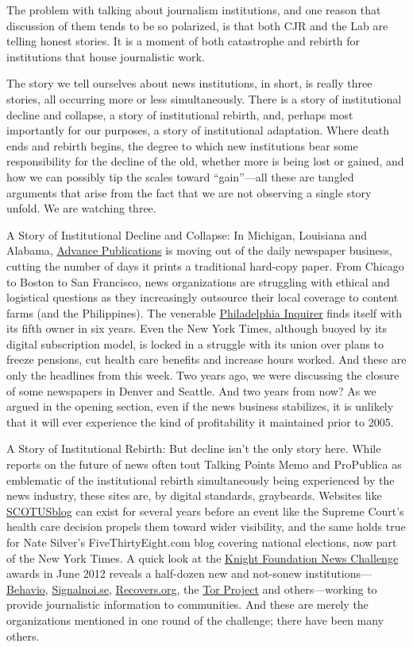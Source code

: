 The problem with talking about journalism institutions, and one reason that discussion
of them tends to be so polarized, is that both CJR and the Lab are telling
honest stories. It is a moment of both catastrophe and rebirth for institutions that
house journalistic work.

The story we tell ourselves about news institutions, in short, is really three stories,
all occurring more or less simultaneously. There is a story of institutional decline
and collapse, a story of institutional rebirth, and, perhaps most importantly for our
purposes, a story of institutional adaptation. Where death ends and rebirth begins,
the degree to which new institutions bear some responsibility for the decline of
the old, whether more is being lost or gained, and how we can possibly tip the
scales toward ``gain''—all these are tangled arguments that arise from the fact that
we are not observing a single story unfold. We are watching three.

A Story of Institutional Decline and Collapse: In Michigan, Louisiana and
Alabama, \href{http://www.advance.net/index.ssf}{Advance Publications} is moving out of the daily newspaper
business, cutting the number of days it prints a traditional hard-copy
paper. From Chicago to Boston to San Francisco, news organizations
are struggling with ethical and logistical questions as they increasingly
outsource their local coverage to content farms (and the Philippines).
The venerable \href{http://www.philly.com/}{Philadelphia Inquirer} finds itself with its fifth owner
in six years. Even the New York Times, although buoyed by its digital
subscription model, is locked in a struggle with its union over plans to
freeze pensions, cut health care benefits and increase hours worked. And
these are only the headlines from this week. Two years ago, we were discussing
the closure of some newspapers in Denver and Seattle. And two
years from now? As we argued in the opening section, even if the news
business stabilizes, it is unlikely that it will ever experience the kind of
profitability it maintained prior to 2005.

A Story of Institutional Rebirth: But decline isn’t the only story here.
While reports on the future of news often tout Talking Points Memo
and ProPublica as emblematic of the institutional rebirth simultaneously
being experienced by the news industry, these sites are, by digital
standards, graybeards. Websites like \href{http://www.scotusblog.com/}{SCOTUSblog} can exist for several
years before an event like the Supreme Court’s health care decision
propels them toward wider visibility, and the same holds true for Nate
Silver’s FiveThirtyEight.com blog covering national elections, now part
of the New York Times. A quick look at the \href{http://newschallenge1.tumblr.com/}{Knight Foundation News
Challenge} awards in June 2012 reveals a half-dozen new and not-sonew
institutions—\href{http://www.behav.io/}{Behavio}, \href{http://signalnoi.se/}{Signalnoi.se}, \href{https://recovers.org/}{Recovers.org}, the \href{https://www.torproject.org/}{Tor Project}
and others—working to provide journalistic information to communities.
And these are merely the organizations mentioned in one round of
the challenge; there have been many others.

